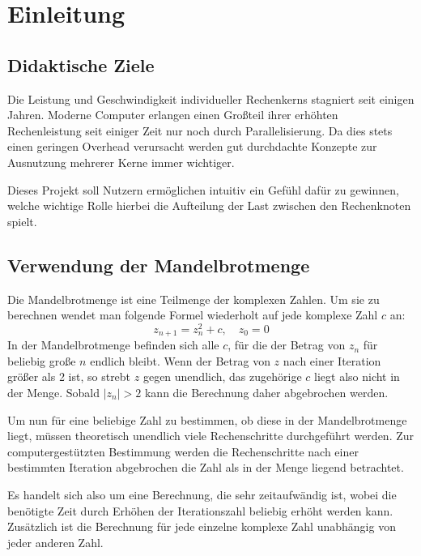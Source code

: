 \section{Einleitung}

\subsection{Didaktische Ziele}

Die Leistung und Geschwindigkeit individueller Rechenkerns stagniert seit einigen Jahren.
Moderne Computer erlangen einen Großteil ihrer erhöhten Rechenleistung
seit einiger Zeit nur noch durch Parallelisierung.
Da dies stets einen geringen Overhead verursacht werden gut durchdachte Konzepte zur Ausnutzung mehrerer Kerne
immer wichtiger.

Dieses Projekt soll Nutzern ermöglichen intuitiv ein Gefühl dafür
zu gewinnen, welche wichtige Rolle hierbei die Aufteilung der Last zwischen
den Rechenknoten spielt.

\subsection{Verwendung der Mandelbrotmenge}

Die Mandelbrotmenge ist eine Teilmenge der komplexen Zahlen. 
Um sie zu berechnen wendet man folgende Formel wiederholt auf jede komplexe Zahl $c$ an:
\begin{equation}
    z_{n+1} = z_{n}^2 + c, \quad z_0 = 0
\end{equation}
In der Mandelbrotmenge befinden sich alle $c$, für die der Betrag von $z_n$ für beliebig große $n$ endlich bleibt.
Wenn der Betrag von $z$ nach einer Iteration größer als 2 ist, so strebt $z$ gegen unendlich, das zugehörige $c$ liegt also nicht in der Menge.
Sobald $|z_n| > 2$ kann die Berechnung daher abgebrochen werden.

Um nun für eine beliebige Zahl zu bestimmen, ob diese in der Mandelbrotmenge liegt, müssen
theoretisch unendlich viele Rechenschritte durchgeführt werden. Zur computergestützten Bestimmung
werden die Rechenschritte nach einer bestimmten Iteration abgebrochen die Zahl als in der Menge liegend betrachtet.

Es handelt sich also um eine Berechnung, die sehr zeitaufwändig ist, wobei
die benötigte Zeit durch Erhöhen der Iterationszahl beliebig erhöht werden kann.
Zusätzlich ist die Berechnung für jede einzelne komplexe Zahl unabhängig von
jeder anderen Zahl.

